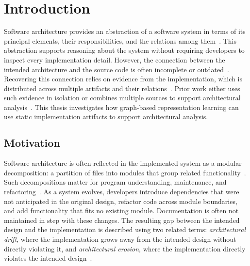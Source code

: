 \chapter{Introduction \label{ch:introduction}}
\chaptertoc

Software architecture provides an abstraction of a software system in terms of its principal elements, their responsibilities, and the relations among them~\cite{clements2003}. This abstraction supports reasoning about the system without requiring developers to inspect every implementation detail. However, the connection between the intended architecture and the source code is often incomplete or outdated~\cite{ali2018architecture,de2012controlling}. Recovering this connection relies on evidence from the implementation, which is distributed across multiple artifacts and their relations~\cite{negar,nsga3}. Prior work either uses such evidence in isolation or combines multiple sources to support architectural analysis~\cite{sarif,zbr,negar}. This thesis investigates how graph-based representation learning can use static implementation artifacts to support architectural analysis.

\section{Motivation}
\label{sec:intro-motivation}

Software architecture is often reflected in the implemented system as a modular decomposition: a partition of files into modules that group related functionality~\cite{parnas1972}. Such decompositions matter for program understanding, maintenance, and refactoring~\cite{clements2003}. As a system evolves, developers introduce dependencies that were not anticipated in the original design, refactor code across module boundaries, and add functionality that fits no existing module. Documentation is often not maintained in step with these changes. The resulting gap between the intended design and the implementation is described using two related terms: \emph{architectural drift}, where the implementation grows away from the intended design without directly violating it, and \emph{architectural erosion}, where the implementation directly violates the intended design~\cite{de2012controlling}.


